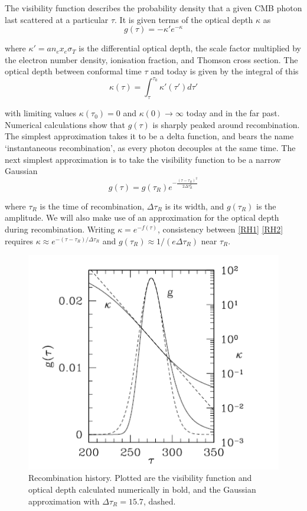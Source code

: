 \documentclass[a4paper,10pt]{article}
\begin{document}
The visibility function describes the probability density that a given CMB photon last scattered at a particular $\tau$. It is given terms of the optical depth $\kappa$ as
\begin{equation}
g(\tau) = -\kappa'e^{-\kappa}
\label{RH1}
\end{equation}

where $\kappa' = an_ex_e\sigma_T$ is the differential optical depth, the scale factor multiplied by the electron number density, ionisation fraction, and Thomson cross section. The optical depth between conformal time $\tau$ and today is given by the integral of this 
\begin{equation}
\kappa(\tau) = \int_\tau^{\tau_0} \kappa'(\tau')d\tau'
\end{equation}

with limiting values $\kappa(\tau_0) = 0$ and $\kappa(0)\rightarrow \infty$ today and in the far past. Numerical calculations show that $g(\tau)$ is sharply peaked around recombination. The simplest approximation takes it to be a delta function, and bears the name `instantaneous recombination', as every photon decouples at the same time. The next simplest approximation is to take the visibility function to be a narrow Gaussian
\begin{equation}
g(\tau) = g(\tau_R)e^{-\frac{(\tau-\tau_R)^2}{2\Delta\tau_R^2}}
\label{RH2}
\end{equation}

where $\tau_R$ is the time of recombination, $\Delta\tau_R$ is its width, and $g(\tau_R)$ is the amplitude. We will also make use of an approximation for the optical depth during recombination. Writing $\kappa = e^{-f(\tau)}$, consistency between \ref{RH1} \nd \ref{RH2} requires $\kappa \approx e^{-(\tau-\tau_R) / \Delta\tau_R}$ and $g(\tau_R)\approx 1/(e\Delta\tau_R)$ near $\tau_R$. 

\begin{figure}[h]
  \includegraphics[width=0.5\linewidth]{recombinationhistory.png}
  \centering
  \caption{Recombination history. Plotted are the visibility function and optical depth calculated numerically in bold, and the Gaussian approximation with $\Delta\tau_R=15.7$, dashed. }
\end{figure}
\end{document}
